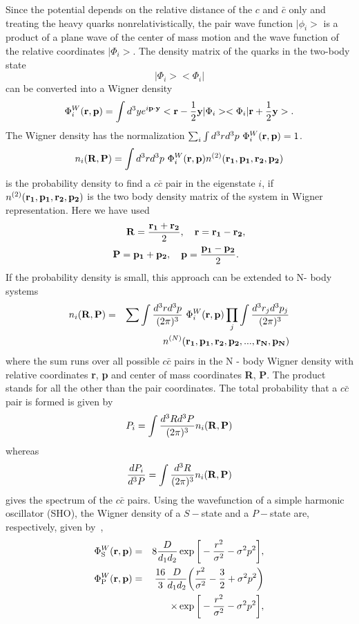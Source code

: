 \documentclass[twocolumn,aps,superscriptaddress,showpacs,nofootinbib,floatfix]{revtex4}
\newcommand{\be}{\begin{equation}}
\newcommand{\ee}{\end{equation}}
\newcommand{\bea}{\begin{eqnarray}}
\newcommand{\eea}{\end{eqnarray}}
\begin{document}
Since the potential depends on the relative distance of the $c$ and  $\bar c$ only and treating the heavy quarks nonrelativistically, the pair wave function $| \phi_i>$ is a product of a plane wave of the center of mass motion and the wave function of the relative coordinates $| \Phi_i>$. The density matrix of the quarks in the two-body state
\be
|\Phi_i><\Phi_i|
\ee
can be converted into a Wigner density
\be
\Phi^W_i({\bf r},{\bf p})=\int d^3y e^{i{\bf p\cdot y}}<{\bf r}-\frac{1}{2}{\bf y}|\Phi_i><\Phi_i|{\bf r}+\frac{1}{2}{\bf y}>.
\ee
The Wigner density has the normalization $\sum_i \int d^3rd^3p\ \Phi^W_i({\bf r},{\bf p})=1$.
\be
n_i({\bf R,P}) =\int  d^3r d^3p\  \Phi^W_i({\bf r},{\bf p})  n^{(2)}({\bf r_1,p_1,r_2,p_2})
\ee
is the probability density to find a $c \bar c$ pair in the eigenstate $i$, if $n^{(2)}({\bf r_1,p_1,r_2,p_2})$ is  the two body density matrix of the system in Wigner representation. Here we have used
\begin{eqnarray}
{\bf R}=\frac{{\bf r_1}+{\bf r_2}}{2},~~~{\bf r}={\bf r_1}-{\bf r_2},\nonumber\\
{\bf P}={\bf p_1}+{\bf p_2},~~~{\bf p}=\frac{{\bf p_1}-{\bf p_2}}{2}.~~
\label{define1}
\end{eqnarray}
If the probability density is small, this approach can be extended to N- body systems
\bea
n_i({\bf R,P}) &=&\sum \int \frac{ d^3r d^3p}{(2\pi)^3}\  \Phi^W_i({\bf r},{\bf p}) \prod_j \int \frac{ d^3r_j d^3p_j}{(2\pi)^3} \nonumber \\
&& n^{(N)}({\bf r_1,p_1,r_2,p_2,...,r_N,p_N})
\eea
where the sum runs over all possible $c \bar c $ pairs in the N - body Wigner density with relative coordinates {\bf r}, {\bf p} and center of mass coordinates {\bf R}, {\bf P}. The product stands for all the other than the pair coordinates. The total probability that a $c \bar c$ pair is formed is given by
\be
P_i=\int \frac{ d^3R d^3P}{(2\pi)^3} n_i({\bf R,P})
\ee
whereas
\be
\frac{dP_i}{d^3P}=\int \frac{ d^3R}{(2\pi)^3} n_i({\bf R,P})
\ee
gives the spectrum of the  $c \bar c $ pairs.
Using the wavefunction of a simple harmonic oscillator (SHO),
the Wigner density of a  $S-$state and a $P-$state are, respectively, given by~\cite{Baltz:1995tv,Cho:2011ew},
\begin{eqnarray}
\Phi^W_{\rm S}({\bf r, p})&=&8\frac{D}{d_1 d_2}\exp\bigg[-\frac{r^2}{\sigma^2}-\sigma^2p^2\bigg],\label{wigner1}\\
\Phi^W_{\rm P}({\bf r, p})&=&\frac{16}{3}\frac{D}{d_1 d_2}\bigg(\frac{r^2}{\sigma^2}-\frac{3}{2}+\sigma^2p^2\bigg)\nonumber\\
&&\times\exp\bigg[-\frac{r^2}{\sigma^2}-\sigma^2p^2\bigg],
\label{wigner2}
\end{eqnarray}
\end{document}
